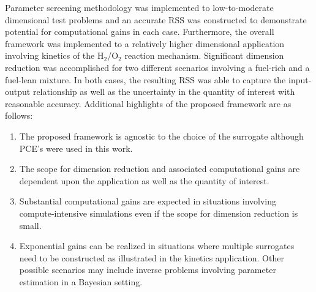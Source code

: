 Parameter screening methodology was implemented to low-to-moderate dimensional
test problems and an accurate RSS was constructed to demonstrate potential for
computational gains in each case. Furthermore, the overall framework was
implemented  to a relatively higher dimensional application involving kinetics
of the H$_2$/O$_2$ reaction mechanism.  Significant dimension reduction was
accomplished for two different scenarios involving a fuel-rich and a fuel-lean
mixture. In both cases, the resulting RSS was able to capture the input-output
relationship as well as the uncertainty in the quantity of interest with
reasonable accuracy. Additional highlights of the proposed framework are as
follows:
\begin{enumerate}
\item The proposed framework is agnostic to the choice of the surrogate although PCE's were used
in this work. 
\item The scope for dimension reduction and associated computational gains are
dependent upon the application as well as the quantity of interest. 
\item Substantial computational gains are expected in situations involving
compute-intensive simulations even if the scope for dimension reduction is
small. 

\item Exponential gains can be realized in situations where multiple surrogates need to be
constructed as illustrated in the kinetics application. Other possible scenarios may
include inverse problems involving parameter estimation in a Bayesian setting. 
\end{enumerate}

